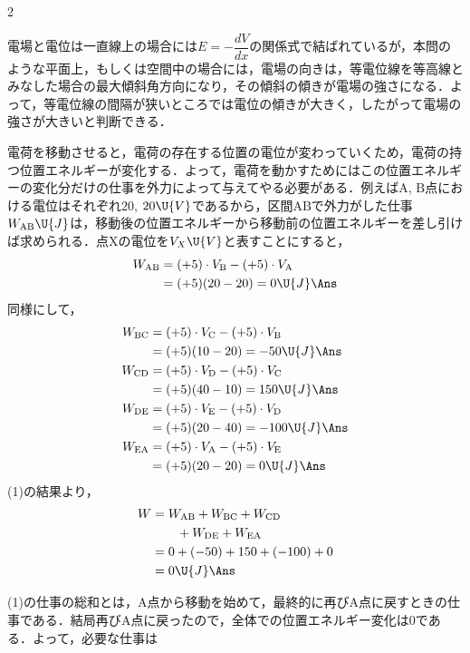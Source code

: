 \begin{multicols}{2}
\begin{sisin}
電場と電位は一直線上の場合には$E=-\dfrac{dV}{dx}$の関係式で結ばれているが，本問のような平面上，もしくは空間中の場合には，電場の向きは，{\gtfamily 等電位線を等高線とみなした場合の最大傾斜角方向}になり，その傾斜の傾きが電場の強さになる．よって，等電位線の間隔が狭いところでは電位の傾きが大きく，したがって電場の強さが大きいと判断できる．
\end{sisin}
\KaiHead
\begin{komon}
 電荷を移動させると，電荷の存在する位置の電位が変わっていくため，電荷の持つ位置エネルギーが変化する．よって，電荷を動かすためにはこの位置エネルギーの変化分だけの仕事を外力によって与えてやる必要がある．例えば$\mathrm{A}$, $\mathrm{B}$点における電位はそれぞれ$20$, $20\U{V}$であるから，区間$\mathrm{AB}$で外力がした仕事$W_{\mathrm{AB}}\U{J}$は，移動後の位置エネルギーから移動前の位置エネルギーを差し引けば求められる．点$\mathrm{X}$の電位を$V_X\U{V}$と表すことにすると，
       \[\begin{aligned}
        W_{\mathrm{AB}}&=(+5)\cdot V_{\mathrm{B}}-(+5)\cdot V_{\mathrm{A}}\\
        &=(+5)(20-20)=0\U{J}\Ans
       \end{aligned}\]
       同様にして，
       \[\begin{aligned}
        W_{\mathrm{BC}}&=(+5)\cdot V_{\mathrm{C}}-(+5)\cdot V_{\mathrm{B}}\\
        &=(+5)(10-20)=-50\U{J}\Ans\\
        W_{\mathrm{CD}}&=(+5)\cdot V_{\mathrm{D}}-(+5)\cdot V_{\mathrm{C}}\\
        &=(+5)(40-10)=150\U{J}\Ans\\
        W_{\mathrm{DE}}&=(+5)\cdot V_{\mathrm{E}}-(+5)\cdot V_{\mathrm{D}}\\
        &=(+5)(20-40)=-100\U{J}\Ans\\
        W_{\mathrm{EA}}&=(+5)\cdot V_{\mathrm{A}}-(+5)\cdot V_{\mathrm{E}}\\
        &=(+5)(20-20)=0\U{J}\Ans
       \end{aligned}\]
 (1)の結果より，
       \[\begin{aligned}
        W&=W_{\mathrm{AB}}+W_{\mathrm{BC}}+W_{\mathrm{CD}}\\
         &\qquad{}+W_{\mathrm{DE}}+W_{\mathrm{EA}}\\
         &=0+(-50)+150+(-100)+0\\
         &=0\U{J}\Ans
       \end{aligned}\]
       \begin{bekkai}
       (1)の仕事の総和とは，$\mathrm{A}$点から移動を始めて，最終的に再び$\mathrm{A}$点に戻すときの仕事である．結局再び$\mathrm{A}$点に戻ったので，全体での位置エネルギー変化は$0$である．よって，必要な仕事は

\end{bekkai}
\end{komon}
\end{multicols}
